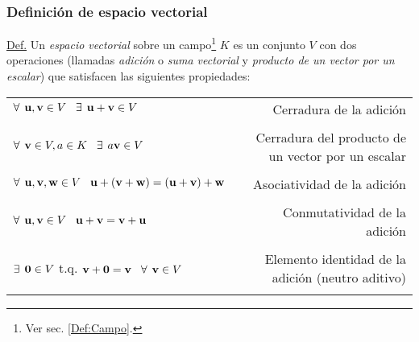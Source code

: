\documentclass[apuntes]{subfiles}
\begin{document}
\subsubsection{Definición de espacio vectorial} \label{Def:Espacio_vectorial}

\begin{tcolorbox} \label{Def:Espacio_vectorial}
\underline{Def.} Un \textit{espacio vectorial} sobre un campo\footnote{Ver sec. \ref{Def:Campo}.} $K$ es un conjunto $V$ con dos operaciones (llamadas \textit{adición} o \textit{suma vectorial} y \textit{producto de un vector por un escalar}) que satisfacen las siguientes propiedades:

\begin{center}
\begin{tabular}{lr}
    $\forall\hspace{1.5mm} \mathbf{u},\mathbf{v}\in V \hspace{3mm}\exists \hspace{1.5mm} \mathbf{u}+\mathbf{v}\in V$ & Cerradura de la adición \\ \\ \multirow{2}{0.4\textwidth}{$\forall\hspace{1.5mm} \mathbf{v}\in V, a\in K \hspace{3mm}\exists \hspace{1.5mm} a\mathbf{v}\in V$} & \multirow{2}{0.28\textwidth}{Cerradura del producto de un vector por un escalar} \\ \\ \\
    $\forall\hspace{1.5mm} \mathbf{u},\mathbf{v},\mathbf{w}\in V\hspace{3mm}\mathbf{u}+(\mathbf{v}+\mathbf{w})=(\mathbf{u}+\mathbf{v})+\mathbf{w}$  & Asociatividad de la adición\\ \\
    $\forall\hspace{1.5mm} \mathbf{u},\mathbf{v}\in V\hspace{3mm}\mathbf{u}+\mathbf{v}=\mathbf{v}+\mathbf{u}$ & Conmutatividad de la adición \\ \\
    $\exists \hspace{1.5mm} \mathbf{0}\in V$ t.q. $\mathbf{v}+\mathbf{0}=\mathbf{v}\hspace{3mm}\forall\hspace{1.5mm} \mathbf{v} \in V$ & Elemento identidad de la adición (neutro aditivo) \\ \\

\end{tabular}
\end{center}
\end{tcolorbox}
\end{document}
